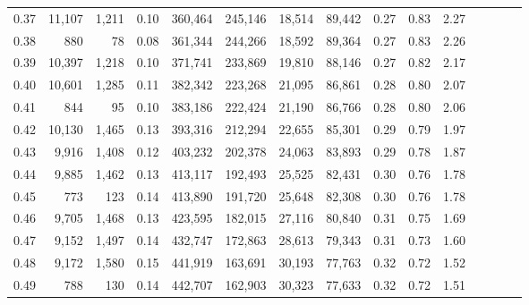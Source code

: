 \begin{tabular}{rrrcrrrrrrrrrrr}
0.37 &  11,107 &   1,211 &                                       0.10 &  360,464 &  245,146 &   18,514 &   89,442 &  0.27 &  0.83 &                         2.27 \\
0.38 &     880 &      78 &                                       0.08 &  361,344 &  244,266 &   18,592 &   89,364 &  0.27 &  0.83 &                         2.26 \\
0.39 &  10,397 &   1,218 &                                       0.10 &  371,741 &  233,869 &   19,810 &   88,146 &  0.27 &  0.82 &                         2.17 \\
0.40 &  10,601 &   1,285 &                                       0.11 &  382,342 &  223,268 &   21,095 &   86,861 &  0.28 &  0.80 &                         2.07 \\
0.41 &     844 &      95 &                                       0.10 &  383,186 &  222,424 &   21,190 &   86,766 &  0.28 &  0.80 &                         2.06 \\
0.42 &  10,130 &   1,465 &                                       0.13 &  393,316 &  212,294 &   22,655 &   85,301 &  0.29 &  0.79 &                         1.97 \\
0.43 &   9,916 &   1,408 &                                       0.12 &  403,232 &  202,378 &   24,063 &   83,893 &  0.29 &  0.78 &                         1.87 \\
0.44 &   9,885 &   1,462 &                                       0.13 &  413,117 &  192,493 &   25,525 &   82,431 &  0.30 &  0.76 &                         1.78 \\
0.45 &     773 &     123 &                                       0.14 &  413,890 &  191,720 &   25,648 &   82,308 &  0.30 &  0.76 &                         1.78 \\
0.46 &   9,705 &   1,468 &                                       0.13 &  423,595 &  182,015 &   27,116 &   80,840 &  0.31 &  0.75 &                         1.69 \\
0.47 &   9,152 &   1,497 &                                       0.14 &  432,747 &  172,863 &   28,613 &   79,343 &  0.31 &  0.73 &                         1.60 \\
0.48 &   9,172 &   1,580 &                                       0.15 &  441,919 &  163,691 &   30,193 &   77,763 &  0.32 &  0.72 &                         1.52 \\
0.49 &     788 &     130 &                                       0.14 &  442,707 &  162,903 &   30,323 &   77,633 &  0.32 &  0.72 &                         1.51 \\

\end{tabular}
